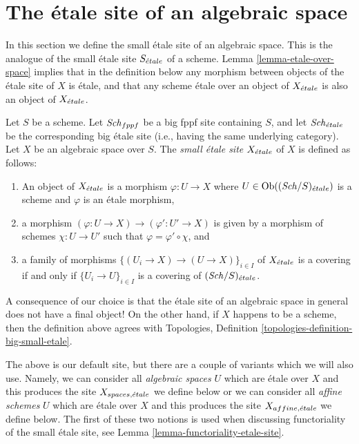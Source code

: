 








\section{The \'etale site of an algebraic space}
\label{section-etale-site}

\noindent
In this section we define the small \'etale site of an algebraic space.
This is the analogue of the small \'etale site $S_{\acute{e}tale}$ of a scheme.
Lemma \ref{lemma-etale-over-space} implies that in the definition below
any morphism between objects of the \'etale site of $X$ is \'etale, and that
any scheme \'etale over an object of $X_{\acute{e}tale}$ is also an object of
$X_{\acute{e}tale}$.

\begin{definition}
\label{definition-etale-site}
Let $S$ be a scheme.
Let $\mathit{Sch}_{fppf}$ be a big fppf site containing $S$,
and let $\mathit{Sch}_{\acute{e}tale}$ be the corresponding big \'etale site
(i.e., having the same underlying category).
Let $X$ be an algebraic space over $S$.
The {\it small \'etale site $X_{\acute{e}tale}$} of $X$ is defined as follows:
\begin{enumerate}
\item An object of $X_{\acute{e}tale}$ is a morphism $\varphi : U \to X$
where $U \in \mathop{\mathrm{Ob}}\nolimits((\mathit{Sch}/S)_{\acute{e}tale})$ is a scheme and
$\varphi$ is an \'etale morphism,
\item a morphism $(\varphi : U \to X) \to (\varphi' : U' \to X)$
is given by a morphism of schemes $\chi : U \to U'$ such that
$\varphi = \varphi' \circ \chi$, and
\item a family of morphisms $\{(U_i \to X) \to (U \to X)\}_{i \in I}$
of $X_{\acute{e}tale}$ is a covering if and only if $\{U_i \to U\}_{i \in I}$
is a covering of $(\mathit{Sch}/S)_{\acute{e}tale}$.
\end{enumerate}
\end{definition}

\noindent
A consequence of our choice is that the \'etale site of an algebraic space
in general does not have a final object! On the other hand, if $X$ happens
to be a scheme, then the definition above agrees with
Topologies, Definition \ref{topologies-definition-big-small-etale}.

\medskip\noindent
The above is our default site, but there are a couple of variants
which we will also use. Namely, we can consider all {\it algebraic spaces}
$U$ which are \'etale over $X$ and this produces the site
$X_{spaces, {\acute{e}tale}}$ we define below or we can consider all {\it affine schemes}
$U$ which are \'etale over $X$ and this produces the site
$X_{affine, {\acute{e}tale}}$ we define below. The first of these two notions
is used when discussing functoriality of the small \'etale site, see
Lemma \ref{lemma-functoriality-etale-site}.

